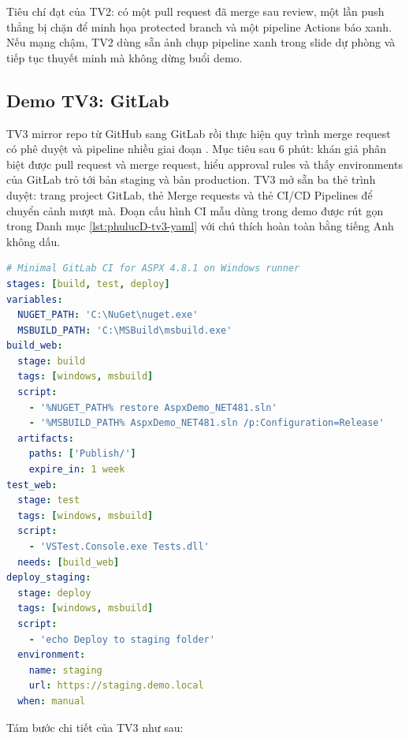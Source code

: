 Tiêu chí đạt của TV2: có một pull request đã merge sau review, một lần push thẳng bị chặn để minh họa protected branch và một pipeline Actions báo xanh.
Nếu mạng chậm, TV2 dùng sẵn ảnh chụp pipeline xanh trong slide dự phòng và tiếp tục thuyết minh mà không dừng buổi demo.

\subsection{Demo TV3: GitLab}
\label{subsec:phulucD-tv3}

TV3 mirror repo từ GitHub sang GitLab rồi thực hiện quy trình merge request có phê duyệt và pipeline nhiều giai đoạn \cite{gitlabdocs,gitlabci}.
Mục tiêu sau 6 phút: khán giả phân biệt được pull request và merge request, hiểu approval rules và thấy environments của GitLab trỏ tới bản staging và bản production.
TV3 mở sẵn ba thẻ trình duyệt: trang project GitLab, thẻ Merge requests và thẻ CI/CD Pipelines để chuyển cảnh mượt mà.
Đoạn cấu hình CI mẫu dùng trong demo được rút gọn trong Danh mục \ref{lst:phulucD-tv3-yaml} với chú thích hoàn toàn bằng tiếng Anh không dấu.

\begin{lstlisting}[language=yaml,caption={Pipeline GitLab CI rút gọn cho ASPX 4.8.1},label={lst:phulucD-tv3-yaml}]
# Minimal GitLab CI for ASPX 4.8.1 on Windows runner
stages: [build, test, deploy]
variables:
  NUGET_PATH: 'C:\NuGet\nuget.exe'
  MSBUILD_PATH: 'C:\MSBuild\msbuild.exe'
build_web:
  stage: build
  tags: [windows, msbuild]
  script:
    - '%NUGET_PATH% restore AspxDemo_NET481.sln'
    - '%MSBUILD_PATH% AspxDemo_NET481.sln /p:Configuration=Release'
  artifacts:
    paths: ['Publish/']
    expire_in: 1 week
test_web:
  stage: test
  tags: [windows, msbuild]
  script:
    - 'VSTest.Console.exe Tests.dll'
  needs: [build_web]
deploy_staging:
  stage: deploy
  tags: [windows, msbuild]
  script:
    - 'echo Deploy to staging folder'
  environment:
    name: staging
    url: https://staging.demo.local
  when: manual
\end{lstlisting}

Tám bước chi tiết của TV3 như sau:

